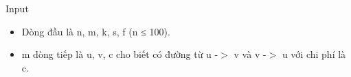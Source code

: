 Input
\begin{itemize}
	\item Dòng đầu là n, m, k, s, f (n ≤ 100).
	\item m dòng tiếp là u, v, c cho biết có đường từ u -$>$ v và v -$>$ u với chi phí là c.
\end{itemize}
